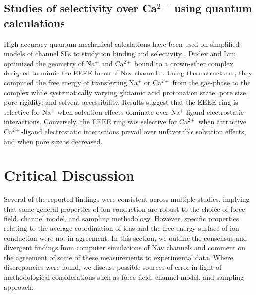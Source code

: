 \begin{refsection}
 \subsection{Studies of selectivity over Ca$^{2+}$ using quantum calculations}
 High-accuracy quantum mechanical calculations have been used on simplified models of channel SFs to study ion binding and selectivity \cite{Dudev:2014ey}.  Dudev and Lim optimized the geometry of Na$^{+}$ and Ca$^{2+}$ bound to a crown-ether complex designed to mimic the EEEE locus of Nav channels \cite{Dudev:2012kl}.  Using these structures, they computed the free energy of transferring Na$^{+}$ or Ca$^{2+}$ from the gas-phase to the complex while systematically varying glutamic acid protonation state, pore size, pore rigidity, and solvent accessibility.  Results suggest that the EEEE ring is selective for Na$^{+}$ when solvation effects dominate over Na$^{+}$-ligand electrostatic interactions.  Conversely, the EEEE ring was selective for Ca$^{2+}$ when attractive Ca$^{2+}$-ligand electrostatic interactions prevail over unfavorable solvation effects, and when pore size is decreased.
 
 \section{Critical Discussion}
 Several of the reported findings were consistent across multiple studies, implying that some general properties of ion conduction are robust to the choice of force field, channel model, and sampling methodology.  However, specific properties relating to the average coordination of ions and the free energy surface of ion conduction were not in agreement.  In this section, we outline the consensus and divergent findings from computer simulations of Nav channels and comment on the agreement of some of these measurements to experimental data.  Where discrepancies were found, we discuss possible sources of error in light of methodological considerations such as force field, channel model, and sampling approach.
 

\end{refsection}
